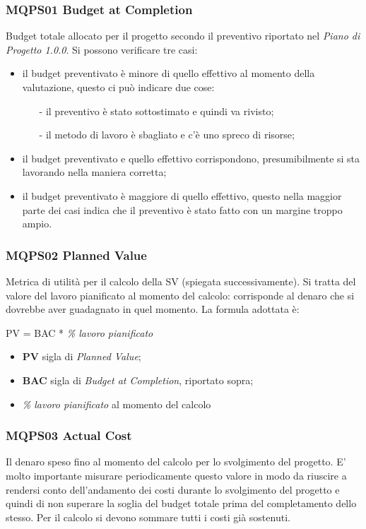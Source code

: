 \subsubsection{MQPS01 Budget at Completion}\label{4.2.5.1}
Budget totale allocato per il progetto secondo il preventivo riportato nel \textit{Piano di Progetto 1.0.0}.
Si possono verificare tre casi:
\begin{itemize}
	\item il budget preventivato è minore di quello effettivo al momento della valutazione, questo ci può indicare due cose:
	 \begin{itemize}
	 	\item[-] il preventivo è stato sottostimato e quindi va rivisto;
	 	\item[-] il metodo di lavoro è sbagliato e c’è uno spreco di risorse;
	 \end{itemize}
 	\item il budget preventivato e quello effettivo corrispondono, presumibilmente si sta lavorando nella maniera corretta;
 	\item il budget preventivato è maggiore di quello effettivo, questo nella maggior parte dei casi indica che il preventivo è stato fatto con un margine troppo ampio.
\end{itemize}

\subsubsection{MQPS02 Planned Value}\label{4.2.5.2}
Metrica di utilità per il calcolo della SV (spiegata successivamente).
Si tratta del valore del lavoro pianificato al momento del calcolo: corrisponde al denaro che
si dovrebbe aver guadagnato in quel momento.
La formula adottata è:  
	\begin{center}
		PV = BAC * \textit{\% lavoro pianificato}
	\end{center}
\begin{itemize}
	\item \textbf{PV} sigla di \textit{Planned Value};
	\item \textbf{BAC} sigla di \textit{Budget at Completion}, riportato sopra;
	\item \textit{\% lavoro pianificato} al momento del calcolo
\end{itemize}

\subsubsection{MQPS03 Actual Cost}\label{4.2.5.3}
Il denaro speso fino al momento del calcolo per lo svolgimento del progetto.
E’ molto importante misurare periodicamente questo valore in modo da riuscire a rendersi conto dell'andamento dei costi durante lo svolgimento del progetto e quindi di non superare la soglia del budget totale prima del completamento dello stesso.
Per il calcolo si devono sommare tutti i costi già sostenuti.

